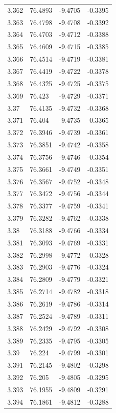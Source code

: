 \begin{tabular}{llll}
3.362 & 76.4893 & -9.4705 & -0.3395 \\
3.363 & 76.4798 & -9.4708 & -0.3392 \\
3.364 & 76.4703 & -9.4712 & -0.3388 \\
3.365 & 76.4609 & -9.4715 & -0.3385 \\
3.366 & 76.4514 & -9.4719 & -0.3381 \\
3.367 & 76.4419 & -9.4722 & -0.3378 \\
3.368 & 76.4325 & -9.4725 & -0.3375 \\
3.369 & 76.423 & -9.4729 & -0.3371 \\
3.37 & 76.4135 & -9.4732 & -0.3368 \\
3.371 & 76.404 & -9.4735 & -0.3365 \\
3.372 & 76.3946 & -9.4739 & -0.3361 \\
3.373 & 76.3851 & -9.4742 & -0.3358 \\
3.374 & 76.3756 & -9.4746 & -0.3354 \\
3.375 & 76.3661 & -9.4749 & -0.3351 \\
3.376 & 76.3567 & -9.4752 & -0.3348 \\
3.377 & 76.3472 & -9.4756 & -0.3344 \\
3.378 & 76.3377 & -9.4759 & -0.3341 \\
3.379 & 76.3282 & -9.4762 & -0.3338 \\
3.38 & 76.3188 & -9.4766 & -0.3334 \\
3.381 & 76.3093 & -9.4769 & -0.3331 \\
3.382 & 76.2998 & -9.4772 & -0.3328 \\
3.383 & 76.2903 & -9.4776 & -0.3324 \\
3.384 & 76.2809 & -9.4779 & -0.3321 \\
3.385 & 76.2714 & -9.4782 & -0.3318 \\
3.386 & 76.2619 & -9.4786 & -0.3314 \\
3.387 & 76.2524 & -9.4789 & -0.3311 \\
3.388 & 76.2429 & -9.4792 & -0.3308 \\
3.389 & 76.2335 & -9.4795 & -0.3305 \\
3.39 & 76.224 & -9.4799 & -0.3301 \\
3.391 & 76.2145 & -9.4802 & -0.3298 \\
3.392 & 76.205 & -9.4805 & -0.3295 \\
3.393 & 76.1955 & -9.4809 & -0.3291 \\
3.394 & 76.1861 & -9.4812 & -0.3288 \\

\end{tabular}
